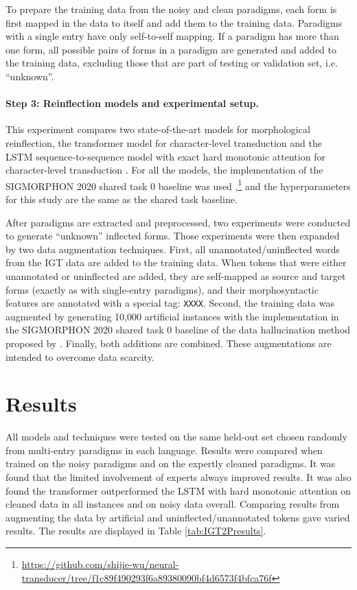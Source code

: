 To prepare the training data from the noisy and clean paradigms, each form is first mapped in the data to itself and add them to the training data. Paradigms with a single entry have only self-to-self mapping. If a paradigm has more than one form, all possible pairs of forms in a paradigm are generated and added to the training data, excluding those that are part of testing or validation set, i.e. ``unknown''.
 

\paragraph{Step 3: Reinflection models and experimental setup.}
This experiment compares two state-of-the-art models for morphological reinflection, the transformer model for character-level transduction \citep{wu2020applying} and the LSTM sequence-to-sequence model with exact hard monotonic attention for character-level transduction \citep{wu-cotterell-2019-exact}. For all the models, the implementation of the SIGMORPHON 2020 shared task 0 baseline was used \citep{vylomova2020sigmorphon},\footnote{\url{https://github.com/shijie-wu/neural-transducer/tree/f1c89f490293f6a89380090bf4d6573f4bfca76f}} and the hyperparameters for this study are the same as the shared task baseline.

After paradigms are extracted and preprocessed, two experiments were conducted to generate ``unknown'' inflected forms. Those experiments were then expanded by two data augmentation techniques. First, all unannotated/uninflected words from the IGT data are added to the training data. When tokens that were either unannotated or uninflected are added, they are self-mapped as source and target forms (exactly as with single-entry paradigms), and their morphosyntactic features are annotated with a special tag: \texttt{XXXX}.  Second, the training data was augmented by generating 10,000 artificial instances with the implementation in the SIGMORPHON 2020 shared task 0 baseline of the data hallucination method proposed by \citep{anastasopoulos-neubig-2019-pushing}. Finally, both additions are combined. These augmentations are intended to overcome data scarcity. 


\section{Results}
\label{sec:IGT2Presults}

All models and techniques were tested on the same held-out set chosen randomly from multi-entry paradigms in each language. Results were compared when trained on the noisy paradigms and on the expertly cleaned paradigms. It was found that the limited involvement of experts always improved results. It was also found the transformer outperformed the LSTM with hard monotonic attention on cleaned data in all instances and on noisy data overall. Comparing results from augmenting the data by artificial and uninflected/unannotated tokens gave varied results. 
The results are displayed in Table \ref{tab:IGT2Presults}. 

